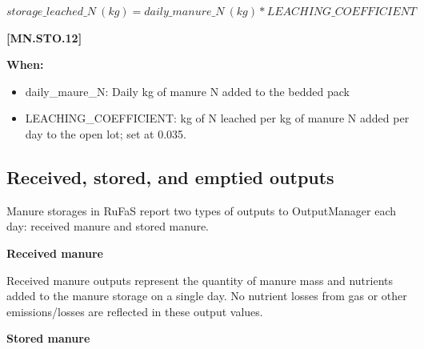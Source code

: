 \begin{refsection}
    \begin{center}
        \(storage\_leached\_N\ (kg) = daily\_manure\_N\ (kg)  * LEACHING\_COEFFICIENT\)
    \end{center}
        \vspace{0.5cm} 
    
            {\raggedleft \textbf{[MN.STO.12]}\par}
            \vspace{0.5cm}

        \textbf{When:}

        \begin{itemize}
            \item daily\_maure\_N: Daily kg of manure N added to the bedded pack
            \item LEACHING\_COEFFICIENT: kg of N leached per kg of manure N added per day to the open lot; set at 0.035.
        \end{itemize}
        \vspace{0.5cm} 


\subsection{Received, stored, and emptied outputs}
\vspace{0.2cm}

Manure storages in RuFaS report two types of outputs to OutputManager each day: received manure and stored manure. 
\vspace{0.2cm}

\textbf{Received manure}
\vspace{ 0.25cm}

Received manure outputs represent the quantity of manure mass and nutrients added to the manure storage on a single day. No nutrient losses from gas or other emissions/losses are reflected in these output values. 
\vspace{0.2cm}

\textbf{Stored manure}
\vspace{ 0.25cm}


\end{refsection}

